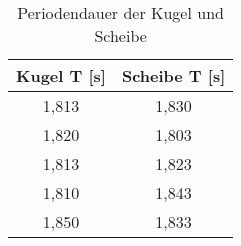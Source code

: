 \begin{table}[h]
	\begin{center}
		\begin{tabular}{cc}
			Kugel T [s]& Scheibe T [s]\\ \hline
			1,813	&1,830\\
			1,820	&1,803\\
			1,813	&1,823\\
			1,810	&1,843\\
			1,850	&1,833\\
		\end{tabular}
		\caption{Periodendauer der Kugel und Scheibe}
		\label{tab:kugelscheibe}
	\end{center}
\end{table}